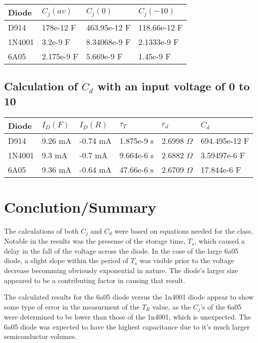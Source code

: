 \documentclass[dvips,10pt]{report}
\begin{document}
\begin{center}
\begin{tabularx}{\textwidth}{X|X|X|X}
	Diode  & $C_j(av)$  & $C_j(0)$ & $C_j(-10)$ \\ \hline

	D914   & 178e-12 F  & 463.95e-12 F & 118.66e-12 F \\
	1N4001 & 3.2e-9 F   & 8.34068e-9 F & 2.1333e-9  F \\
	6A05   & 2.175e-9 F & 5.669e-9 F   & 1.45e-9 F

\end{tabularx}
\end{center}

\subsection{Calculation of $C_d$ with an input voltage of 0 to 10}

\begin{center}
\begin{tabularx}{\textwidth}{X|X|X|X|X|X}

	Diode  & $I_D(F)$ & $I_D(R)$ & $\tau_T$   & $r_d$           &
	$C_d$ \\ \hline
	
	D914   & 9.26 mA  & -0.74 mA & 1.875e-9 s & 2.6998 $\Omega$ & 
	694.495e-12 F\\

	1N4001 & 9.3 mA   & -0.7 mA  & 9.664e-6 s & 2.6882 $\Omega$ &
	3.59497e-6 F \\

	6A05   & 9.36 mA  & -0.64 mA & 47.66e-6 s & 2.6709 $\Omega$ &
	17.844e-6 F
\end{tabularx}
\end{center}

\section{Conclution/Summary}

The calculations of both $C_j$ and $C_d$ were based on equations needed
for the class. Notable in the results was the presense of the storage
time, $T_s$, which caused a delay in the fall of the voltage across the
diode. In the case of the large 6a05 diode, a slight slope within the
period of $T_s$ was visible prior to the voltage decrease becomming
obviously exponential in nature. The diode's larger size appeared to be a
contributing factor in causing that result.

The calculated results for the 6a05 diode versus the 1n4001 diode appear
to show some type of error in the measurment of the $T_R$ value, as the
$C_j$'s of the 6a05 were determined to be lower than those of the 1n4001,
which is unexpected. The 6a05 diode was expected to have the highest
capacitance due to it's much larger semiconductor volumes.


\end{document}
